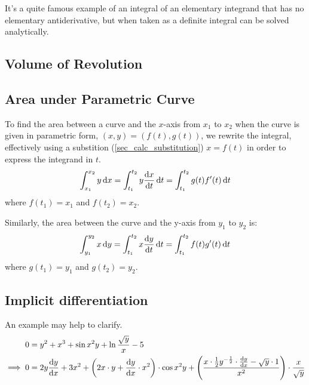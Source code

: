 \documentclass[fleqn,a4paper,11pt]{article}
\begin{document}
    It's a quite famous example of an integral of an elementary integrand that
    has no elementary antiderivative, but when taken as a definite integral can
    be solved analytically.

    \subsection{Volume of Revolution}

    \subsection{Area under Parametric Curve} \label{sec_calc_parametric_area}

    To find the area between a curve and the \(x\)-axis from \(x_1\) to \(x_2\)
    when the curve is given in parametric form, \((x, y) = (f(t), g(t))\),
    we rewrite the integral, effectively using a substition
    (\ref{sec_calc_substitution}) \(x = f(t)\) in order to express the integrand
    in \(t\).
    \begin{equation}
    \int_{x_1}^{x_2} y \dd{x} =
     \int_{t_1}^{t_2} y \dv{x}{t} \dd{t} =
     \int_{t_1}^{t_2} g(t)f'(t) \dd{t}
    \end{equation}
    where \(f(t_1) = x_1\) and \(f(t_2) = x_2\).

    Similarly, the area between the curve and the y-axis from \(y_1\) to \(y_2\)
    is:
    \begin{equation}
    \int_{y_1}^{y_2} x \dd{y} =
     \int_{t_1}^{t_2} x \dv{y}{t} \dd{t} =
     \int_{t_1}^{t_2} f(t)g'(t) \dd{t}
    \end{equation}
    where \(g(t_1) = y_1\) and \(g(t_2) = y_2\).

    \subsection{Implicit differentiation}



    An example may help to clarify.
    \begin{align*}
    0 &= y^2 + x^3 + \sin x^2 y + \ln \frac{\sqrt y} x - 5 \\
    \implies 0 &=
                2y \dv{y}{x} + 3x^2 +
                \pqty{2x \cdot y + \dv{y}{x} \cdot x^2} \cdot \cos x^2 y +
                \pqty{\frac{x \cdot \frac 12 y^{-\frac 12} \cdot \dv{y}{x} -
                            \sqrt y \cdot 1}
                           {x^2}} \cdot \frac{x}{\sqrt y} \\
    \end{align*}
\end{document}
